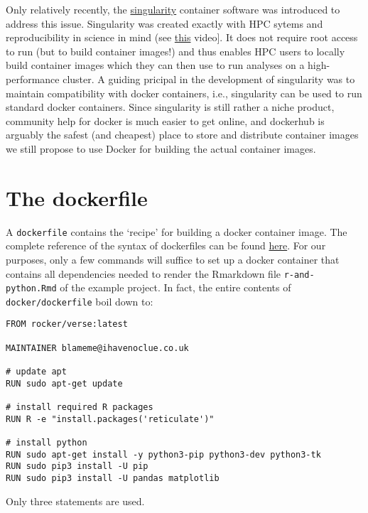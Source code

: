 \documentclass[]{book}
\begin{document}
Only relatively recently, the \href{https://www.sylabs.io/}{singularity}
container software was introduced to address this issue. Singularity was
created exactly with HPC sytems and reproducibility in science in mind
(see \href{https://www.youtube.com/watch?v=DA87Ba2dpNM}{this} video{]}.
It does not require root access to run (but to build container images!)
and thus enables HPC users to locally build container images which they
can then use to run analyses on a high-performance cluster. A guiding
pricipal in the development of singularity was to maintain compatibility
with docker containers, i.e., singularity can be used to run standard
docker containers. Since singularity is still rather a niche product,
community help for docker is much easier to get online, and dockerhub is
arguably the safest (and cheapest) place to store and distribute
container images we still propose to use Docker for building the actual
container images.

\section{The dockerfile}\label{the-dockerfile}

A \texttt{dockerfile} contains the `recipe' for building a docker
container image. The complete reference of the syntax of dockerfiles can
be found \href{https://docs.docker.com/engine/reference/builder/}{here}.
For our purposes, only a few commands will suffice to set up a docker
container that contains all dependencies needed to render the Rmarkdown
file \texttt{r-and-python.Rmd} of the example project. In fact, the
entire contents of \texttt{docker/dockerfile} boil down to:

\begin{verbatim}
FROM rocker/verse:latest

MAINTAINER blameme@ihavenoclue.co.uk

# update apt
RUN sudo apt-get update

# install required R packages
RUN R -e "install.packages('reticulate')"

# install python
RUN sudo apt-get install -y python3-pip python3-dev python3-tk
RUN sudo pip3 install -U pip
RUN sudo pip3 install -U pandas matplotlib
\end{verbatim}

Only three statements are used.
\end{document}
